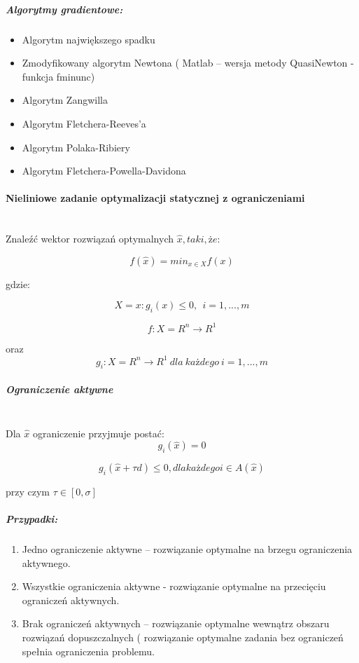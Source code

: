 \documentclass[a4paper,twoside]{report}
\begin{document}
\subparagraph{Algorytmy gradientowe:}
\begin{itemize}
\item Algorytm największego spadku
\item Zmodyfikowany algorytm Newtona ( Matlab – wersja metody QuasiNewton
- funkcja fminunc)
\item Algorytm Zangwilla
\item Algorytm Fletchera-Reeves’a
\item Algorytm Polaka-Ribiery
\item Algorytm Fletchera-Powella-Davidona
\end{itemize}


\paragraph{Nieliniowe zadanie optymalizacji statycznej z ograniczeniami\\\\}
Znaleźć wektor rozwiązań optymalnych $\hat{x}, taki, że:$

$$f(\hat{x})=min_{x \in X}f(x)$$

gdzie:

$$X={x:g_i(x) \le 0,~~i=1,...,m}$$

$$f:X = R^n \longrightarrow R^1$$

oraz $$g_i:X = R^n \longrightarrow R^1~dla~każdego~i=1,...,m$$

\subparagraph{Ograniczenie aktywne\\\\}

Dla $\hat{x}$ ograniczenie przyjmuje postać:
\[  g_i(\hat{x})=0 \]


$$ g_i(\hat{x}+\tau d) \le 0, dla każdego i \in A(\hat{x})$$

przy czym $\tau \in [0,\sigma]$



\subparagraph{Przypadki:}

\begin{enumerate}

\item Jedno ograniczenie aktywne – rozwiązanie optymalne na brzegu ograniczenia
aktywnego.
\item Wszystkie ograniczenia aktywne - rozwiązanie optymalne na przecięciu ograniczeń
aktywnych.
\item Brak ograniczeń aktywnych – rozwiązanie optymalne wewnątrz obszaru rozwiązań
dopuszczalnych ( rozwiązanie optymalne zadania bez ograniczeń spełnia
ograniczenia problemu.

\end{enumerate}
\end{document}
